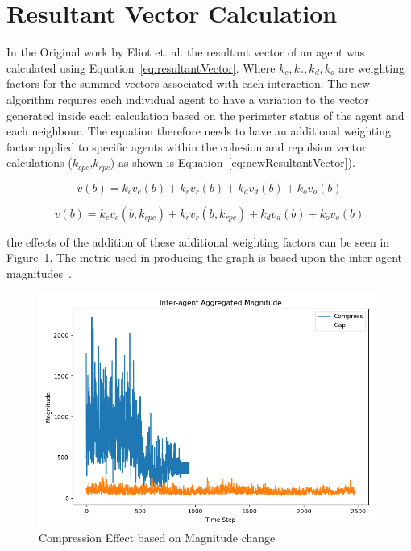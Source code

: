 \documentclass[12pt,a4paper]{article}
\begin{document}
\section{Resultant Vector Calculation}
In the Original work by Eliot et. al. the resultant vector of an agent was calculated using Equation~\ref{eq:resultantVector}. Where $k_c,k_r,k_d,k_o$ are weighting factors for the summed vectors associated with each interaction. The new algorithm requires each individual agent to have a variation to the vector generated inside each calculation based on the perimeter status of the agent and each neighbour. The equation therefore needs to have an additional weighting factor applied to specific agents within the cohesion and repulsion vector calculations ($k_{cpc}$,$k_{rpc}$) as shown is Equation~\ref{eq:newResultantVector}).

\begin{equation}\label{eq:resultantVector}
	v(b) = k_cv_c(b) + k_rv_r(b) + k_dv_d(b) + k_ov_o(b)
\end{equation}
	
\begin{equation}\label{eq:newResultantVector}
	v(b) = k_cv_c(b,k_{cpc}) + k_rv_r(b,k_{rpc}) + k_dv_d(b) + k_ov_o(b)
\end{equation}

the effects of the addition of these additional weighting factors can be seen in Figure~\ref{fig:compressioneffect1}. The metric used in producing the graph is based upon the inter-agent magnitudes~\cite{eliot2018metric}.

\begin{figure}[h]
	\centering
	\includegraphics[width=0.75\linewidth]{figures/CompressionEffect1}
	\caption[Compression Effect]{Compression Effect based on Magnitude change}
	\label{fig:compressioneffect1}
\end{figure}
\end{document}
